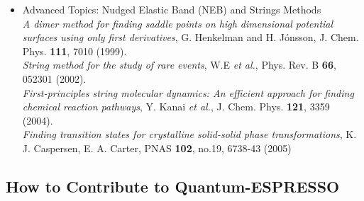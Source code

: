 \documentclass[12pt,a4paper]{article}
\begin{document}
\begin{itemize}
\item Advanced Topics: Nudged Elastic Band (NEB) and Strings Methods
\medskip \\
  \emph{A dimer method for finding saddle points on high dimensional 
    potential surfaces using only first derivatives}, G. Henkelman and 
    H. J{\'o}nsson, J. Chem. Phys. \textbf{111}, 7010 (1999).\\
  \emph{String method for the study of rare events}, W.E \emph{et al.},
  Phys. Rev. B \textbf{66}, 052301 (2002).\\
  \emph{First-principles string molecular dynamics: An efficient approach
    for finding chemical reaction pathways}, Y. Kanai \emph{et al.},
  J. Chem. Phys. \textbf{121}, 3359 (2004).\\
  {\em Finding transition states for crystalline solid-solid phase 
    transformations}, K. J. Caspersen, E. A. Carter, 
  PNAS \textbf{102}, no.19, 6738-43 (2005)

\end{itemize}

\subsection{How to Contribute to Quantum-ESPRESSO}
\end{document}
